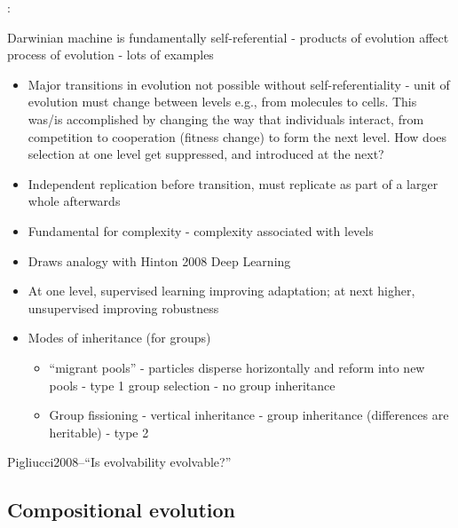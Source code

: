 \begin{NOTES}
\autocite{Watson2015}:

Darwinian machine is fundamentally self-referential - products of evolution affect process of evolution - lots of examples

\begin{itemize}
\item Major transitions in evolution not possible without self-referentiality - unit of evolution must change between levels e.g., from molecules to cells. This was/is accomplished by changing the way that individuals interact, from competition to cooperation (fitness change) to form the next level. How does selection at one level get suppressed, and introduced at the next?
\item Independent replication before transition, must replicate as part of a larger whole afterwards
\item Fundamental for complexity - complexity associated with levels
\item Draws analogy with Hinton 2008 Deep Learning
\item At one level, supervised learning improving adaptation; at next higher, unsupervised improving robustness
\item Modes of inheritance (for groups)
\begin{itemize}
\item
``migrant pools'' - particles disperse horizontally and reform
into new pools - type 1 group selection - no group inheritance
\item
Group fissioning - vertical inheritance - group inheritance
(differences are heritable) - type 2
\end{itemize}
\end{itemize}


Pigliucci2008--``Is evolvability evolvable?''
\end{NOTES}

\subsection{Compositional evolution}\label{compositional-evolution}

